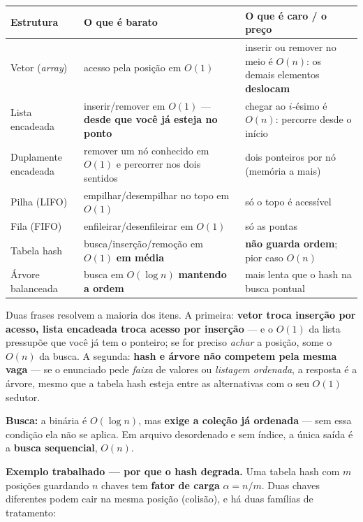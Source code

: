 \begin{conceito}
\begin{center}
\begin{tabular}{@{}p{2.9cm}p{4.2cm}p{4.4cm}@{}}
\toprule
\textbf{Estrutura} & \textbf{O que é barato} & \textbf{O que é caro / o preço} \\
\midrule
Vetor (\emph{array}) & acesso pela posição em $O(1)$ & inserir ou remover no meio é $O(n)$: os demais elementos \textbf{deslocam} \\
Lista encadeada & inserir/remover em $O(1)$ --- \textbf{desde que você já esteja no ponto} & chegar ao $i$-ésimo é $O(n)$: percorre desde o início \\
Duplamente encadeada & remover um nó conhecido em $O(1)$ e percorrer nos dois sentidos & dois ponteiros por nó (memória a mais) \\
Pilha (LIFO) & empilhar/desempilhar no topo em $O(1)$ & só o topo é acessível \\
Fila (FIFO) & enfileirar/desenfileirar em $O(1)$ & só as pontas \\
Tabela hash & busca/inserção/remoção em $O(1)$ \textbf{em média} & \textbf{não guarda ordem}; pior caso $O(n)$ \\
Árvore balanceada & busca em $O(\log n)$ \textbf{mantendo a ordem} & mais lenta que o hash na busca pontual \\
\bottomrule
\end{tabular}
\end{center}

Duas frases resolvem a maioria dos itens. A primeira: \textbf{vetor troca
inserção por acesso, lista encadeada troca acesso por inserção} --- e o $O(1)$
da lista pressupõe que você já tem o ponteiro; se for preciso \emph{achar} a
posição, some o $O(n)$ da busca. A segunda: \textbf{hash e árvore não competem
pela mesma vaga} --- se o enunciado pede \emph{faixa} de valores ou
\emph{listagem ordenada}, a resposta é a árvore, mesmo que a tabela hash esteja
entre as alternativas com o seu $O(1)$ sedutor.

\textbf{Busca:} a binária é $O(\log n)$, mas \textbf{exige a coleção já
ordenada} --- sem essa condição ela não se aplica. Em arquivo desordenado e sem
índice, a única saída é a \textbf{busca sequencial}, $O(n)$.
\end{conceito}

\textbf{Exemplo trabalhado --- por que o hash degrada.} Uma tabela hash com
$m$ posições guardando $n$ chaves tem \textbf{fator de carga}
$\alpha = n/m$. Duas chaves diferentes podem cair na mesma posição (colisão), e
há duas famílias de tratamento:

